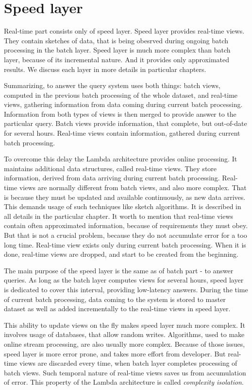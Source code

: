 \section{Speed layer}

Real-time part consists only of speed layer.
Speed layer provides real-time views.
They contain sketches of data, that is being obesrved during ongoing batch processing in the batch layer.
Speed layer is much more complex than batch layer, because of its incremental nature.
And it provides only approximated results.
We discuss each layer in more details in particular chapters.

Summarizing, to answer the query system uses both things: batch views, computed
in the previous batch processing of the whole dataset, and real-time views,
gathering information from data coming during current batch processing.
Information from both types of views is then merged to provide answer to the
particular query.
Batch views provide information, that complete, but out-of-date for
several hours.
Real-time views contain information, gathered during current batch processing.

To overcome this delay the Lambda architecture provides online processing.
It maintains additional data structures, called real-time views.
They store information, derived from data arriving during current batch
processing.
Real-time views are normally different from batch views, and also more complex.
That is because they must be updated and available continuously, as new data
arrives.
This demands usage of such techniques like sketch algorithms.
It is described in all details in the particular chapter.
It worth to mention that real-time views contain often approximated information,
because of requirements they must obey.
But that is not a crucial problem, because they do not accumulate error for a
too long time.
Real-time view exists only during current batch processing.
When it is done, real-time views are dropped, and start to be created from the
beginning.

The main purpose of the speed layer is the same as of batch part - to answer
queries.
As long as the batch layer computes views for several hours, speed layer is
dedicated to cover this interval, providing low-latency answers.
During the time of current batch processing, data coming to the system is stored
to master dataset as well as added incrementally to the real-time views in
speed layer.

This ability to update views on the fly makes speed layer much more complex.
It involves usage of databases, that allow random writes.
Algorithms, used to make online stream processing, are also usually more
complex.
Because of those issues, speed layer is more error prone, and takes more effort
from developer.
But real-time views are discarded every time, when batch layer completes
processing of batch views.
Such temporal nature of real-time views saves us from accumulation of
error.
This property of the Lambda architecture is called \textit{complexity isolation}.


